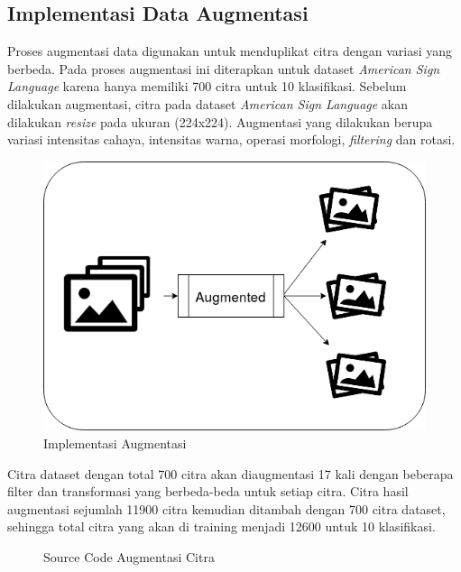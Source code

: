 \subsection{Implementasi Data Augmentasi}
Proses augmentasi data digunakan untuk menduplikat citra dengan variasi yang berbeda. Pada proses augmentasi ini diterapkan untuk dataset \textit{American Sign Language} karena hanya memiliki 700 citra untuk 10 klasifikasi. Sebelum dilakukan augmentasi, citra pada dataset \textit{American Sign Language} akan dilakukan \textit{resize} pada ukuran (224x224). Augmentasi yang dilakukan berupa variasi intensitas cahaya, intensitas warna, operasi morfologi, \textit{filtering} dan rotasi.
\begin{figure}[H]
	\centering
	\includegraphics[width=0.6\linewidth]{augmented}
	\caption{Implementasi Augmentasi}
	\label{fig:augmented}
\end{figure}

Citra dataset dengan total 700 citra akan diaugmentasi 17 kali dengan beberapa filter dan transformasi yang berbeda-beda untuk setiap citra. Citra hasil augmentasi sejumlah 11900 citra kemudian ditambah dengan 700 citra dataset, sehingga total citra yang akan di training menjadi 12600 untuk 10 klasifikasi.
\begin{figure}[H]
	\centering
	
	\caption{Source Code Augmentasi Citra}
\end{figure}
